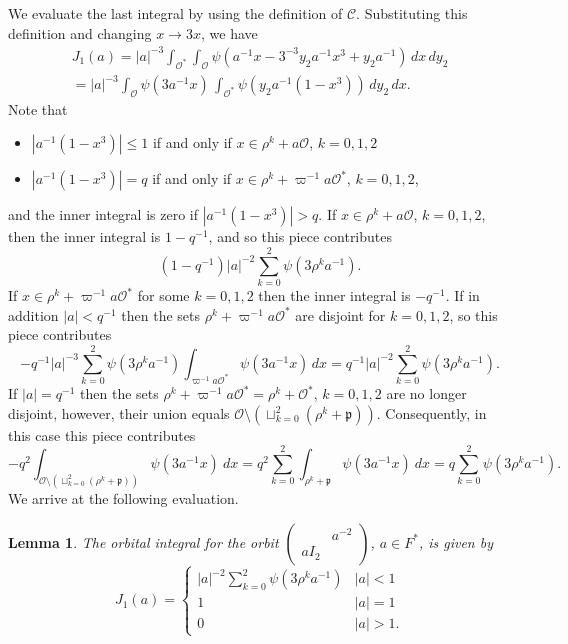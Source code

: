 \documentclass[12pt]{amsart}
\newcommand{\abs}[1]{\left|{#1}\right|}
\newcommand{\p}{\mathfrak{p}}
\renewcommand{\O}{\mathcal{O}}
\newcommand{\Cu}{\mathcal{C}}
\newtheorem{lemma}[theorem]{Lemma}
\theoremstyle{remark}
\begin{document}
We evaluate the last integral by using the definition of $\Cu$.  Substituting this definition and changing $x\to 3 x$, we have
\begin{multline*}
J_1(a)=\abs{a}^{-3}\int_{\O^*}\int_{\O} \psi(a^{-1}x-3^{-3}y_2a^{-1}x^3+y_2a^{-1})\,dx\,dy_2\\
=\abs{a}^{-3}\int_{\O}\psi(3a^{-1}x)\,\int_{\O^*}\psi(y_2a^{-1}(1-x^3))\,dy_2\,dx.
\end{multline*}
Note that
\begin{itemize}
\item $\abs{a^{-1}(1-x^3)}\leq1$ if and only if $x\in \rho^k+a\O$, $k=0,1,2$
\item $\abs{a^{-1}(1-x^3)}=q$ if and only if $x\in \rho^k+\varpi^{-1}a\O^*$, $k=0,1,2$,
\end{itemize}
and the inner integral is zero if $\abs{a^{-1}(1-x^3)}>q$. 
If $x\in\rho^k+a\O$, $k=0,1,2$, then the inner integral is $1-q^{-1}$, and so this piece contributes
$$(1-q^{-1})\abs{a}^{-2}\sum_{k=0}^2 \psi(3\rho^k a^{-1}).$$
 If $x\in\rho^k+\varpi^{-1}a\O^*$ for some $k=0,1,2$ then the inner integral is $-q^{-1}$. If in addition $\abs{a}<q^{-1}$ then the sets $\rho^k+\varpi^{-1}a\O^*$ are disjoint for $k=0,1,2$, so this piece contributes
 $$-q^{-1}\abs{a}^{-3}\sum_{k=0}^2\psi(3\rho^ka^{-1})\int_{\varpi^{-1}a\O^*}\psi(3a^{-1}x)\,dx=q^{-1}\abs{a}^{-2}\sum_{k=0}^2\psi(3\rho^k a^{-1}) .$$
If $\abs{a}=q^{-1}$ then the sets $\rho^k+\varpi^{-1}a\O^*=\rho^k+\O^*$, $k=0,1,2$ are no longer disjoint, however, their union equals $\O\setminus (\sqcup_{k=0}^2 (\rho^k+\p))$. Consequently, in this case this piece contributes
\[
-q^2\int_{\O\setminus (\sqcup_{k=0}^2 (\rho^k+\p))}\psi(3a^{-1}x)\ dx=q^2\sum_{k=0}^2 \int_{\rho^k+\p} \psi(3a^{-1}x)\ dx=q\sum_{k=0}^2 \psi(3\rho^k a^{-1}).
\]
We arrive at the following evaluation.
\begin{lemma}  The orbital integral for the orbit $\begin{pmatrix} &   a^{-2}  \\ aI_2 &    \end{pmatrix}$, $a\in F^*$, is given by
$$J_1(a)=\begin{cases} \abs{a}^{-2}\sum_{k=0}^2 \psi(3\rho^ka^{-1})&\abs{a}<1\\
1&\abs{a}=1\\
0&\abs{a}>1.
\end{cases}$$
\end{lemma}
\end{document}

